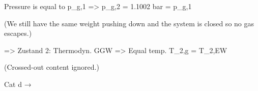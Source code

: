 Pressure is equal to p_g,1  
=> p_g,2 = 1.1002 bar = p_g,1  

(We still have the same weight pushing down and the system is closed so no gas escapes.)  

=> Zustand 2: Thermodyn. GGW => Equal temp.  
T_2,g = T_2,EW  

(Crossed-out content ignored.)  

Cat d →
